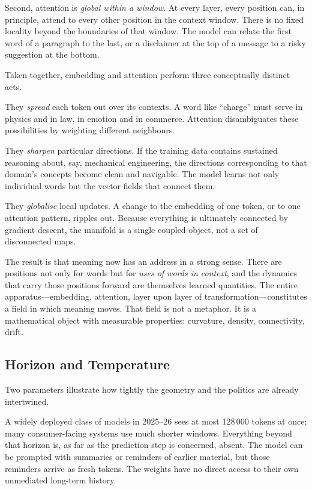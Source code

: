 \documentclass[12pt,a4paper]{report}
\begin{document}
Second, attention is \emph{global within a window}. At every layer, every position can, in principle, attend to every other position in the context window. There is no fixed locality beyond the boundaries of that window. The model can relate the first word of a paragraph to the last, or a disclaimer at the top of a message to a risky suggestion at the bottom.

Taken together, embedding and attention perform three conceptually distinct acts.

They \emph{spread} each token out over its contexts. A word like ``charge'' must serve in physics and in law, in emotion and in commerce. Attention disambiguates these possibilities by weighting different neighbours.

They \emph{sharpen} particular directions. If the training data contains sustained reasoning about, say, mechanical engineering, the directions corresponding to that domain's concepts become clean and navigable. The model learns not only individual words but the vector fields that connect them.

They \emph{globalise} local updates. A change to the embedding of one token, or to one attention pattern, ripples out. Because everything is ultimately connected by gradient descent, the manifold is a single coupled object, not a set of disconnected maps.

The result is that meaning now has an address in a strong sense. There are positions not only for words but for \emph{uses of words in context}, and the dynamics that carry those positions forward are themselves learned quantities. The entire apparatus---embedding, attention, layer upon layer of transformation---constitutes a field in which meaning moves. That field is not a metaphor. It is a mathematical object with measurable properties: curvature, density, connectivity, drift.

\subsection*{Horizon and Temperature}

Two parameters illustrate how tightly the geometry and the politics are already intertwined.

A widely deployed class of models in 2025--26 sees at most 128\,000 tokens at once; many consumer-facing systems use much shorter windows. Everything beyond that horizon is, as far as the prediction step is concerned, absent. The model can be prompted with summaries or reminders of earlier material, but those reminders arrive as fresh tokens. The weights have no direct access to their own unmediated long-term history.
\end{document}

